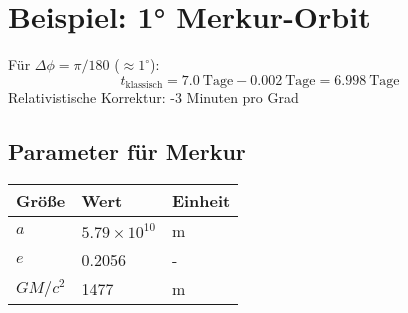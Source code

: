 \section{Beispiel: 1° Merkur-Orbit}
Für $\Delta\phi = \pi/180$ ($\approx1^\circ$):
\[
t_\text{klassisch} = 7.0\ \text{Tage} - 0.002\ \text{Tage} = 6.998\ \text{Tage}
\]
Relativistische Korrektur: -3 Minuten pro Grad

\subsection{Parameter für Merkur}
\begin{tabular}{|l|l|l|}
\hline
\textbf{Größe} & \textbf{Wert} & \textbf{Einheit} \\ \hline
$a$ & $5.79 \times 10^{10}$ & m \\ \hline
$e$ & 0.2056 & - \\ \hline
$GM/c^2$ & 1477 & m \\ \hline
\end{tabular}